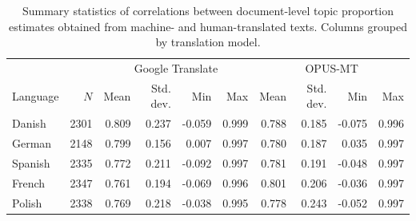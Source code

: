 \begin{table}[!t]

\caption{\label{tab:topic_proportion_similarity}Summary statistics of correlations between document-level topic proportion estimates obtained from machine- and human-translated texts. Columns grouped by translation model.}
\centering
\fontsize{10}{12}\selectfont
\begin{tabular}[t]{lrrrrrrrrr}
\toprule
\multicolumn{2}{c}{ } & \multicolumn{4}{c}{Google Translate} & \multicolumn{4}{c}{OPUS-MT} \\
\cmidrule(l{3pt}r{3pt}){3-6} \cmidrule(l{3pt}r{3pt}){7-10}
Language & $N$ & Mean & Std. dev. & Min & Max & Mean & Std. dev. & Min & Max\\
\midrule
Danish & 2301 & 0.809 & 0.237 & -0.059 & 0.999 & 0.788 & 0.185 & -0.075 & 0.996\\
German & 2148 & 0.799 & 0.156 & 0.007 & 0.997 & 0.780 & 0.187 & 0.035 & 0.997\\
Spanish & 2335 & 0.772 & 0.211 & -0.092 & 0.997 & 0.781 & 0.191 & -0.048 & 0.997\\
French & 2347 & 0.761 & 0.194 & -0.069 & 0.996 & 0.801 & 0.206 & -0.036 & 0.997\\
Polish & 2338 & 0.769 & 0.218 & -0.038 & 0.995 & 0.778 & 0.243 & -0.052 & 0.997\\
\bottomrule
\end{tabular}
\end{table}
